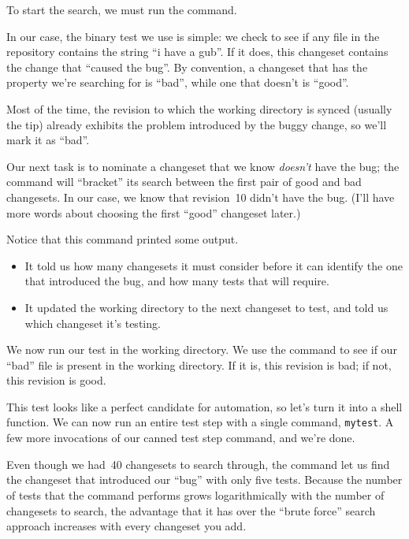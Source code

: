 To start the search, we must run the  command.

In our case, the binary test we use is simple: we check to see if any
file in the repository contains the string ``i have a gub''.  If it
does, this changeset contains the change that ``caused the bug''.  By
convention, a changeset that has the property we're searching for is
``bad'', while one that doesn't is ``good''.

Most of the time, the revision to which the working directory is
synced (usually the tip) already exhibits the problem introduced by
the buggy change, so we'll mark it as ``bad''.

Our next task is to nominate a changeset that we know \emph{doesn't}
have the bug; the  command will ``bracket'' its search
between the first pair of good and bad changesets.  In our case, we
know that revision~10 didn't have the bug.  (I'll have more words
about choosing the first ``good'' changeset later.)

Notice that this command printed some output.
\begin{itemize}
\item It told us how many changesets it must consider before it can
  identify the one that introduced the bug, and how many tests that
  will require.
\item It updated the working directory to the next changeset to test,
  and told us which changeset it's testing.
\end{itemize}

We now run our test in the working directory.  We use the
 command to see if our ``bad'' file is present in the
working directory.  If it is, this revision is bad; if not, this
revision is good.

This test looks like a perfect candidate for automation, so let's turn
it into a shell function.
We can now run an entire test step with a single command,
\texttt{mytest}.
A few more invocations of our canned test step command, and we're
done.

Even though we had~40 changesets to search through, the 
command let us find the changeset that introduced our ``bug'' with
only five tests.  Because the number of tests that the 
command performs grows logarithmically with the number of changesets to
search, the advantage that it has over the ``brute force'' search
approach increases with every changeset you add.

